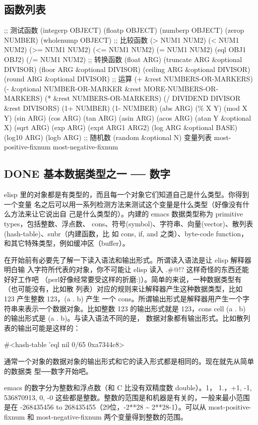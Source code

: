 \documentclass[11pt]{ctexart}
\begin{document}
\subsection{函数列表}
\label{sec:org5c351c1}
;; 测试函数
(integerp OBJECT)
(floatp OBJECT)
(numberp OBJECT)
(zerop NUMBER)
(wholenump OBJECT)
;; 比较函数
(> NUM1 NUM2)
(< NUM1 NUM2)
(>= NUM1 NUM2)
(<= NUM1 NUM2)
(= NUM1 NUM2)
(eql OBJ1 OBJ2)
(/= NUM1 NUM2)
;; 转换函数
(float ARG)
(truncate ARG \&optional DIVISOR)
(floor ARG \&optional DIVISOR)
(ceiling ARG \&optional DIVISOR)
(round ARG \&optional DIVISOR)
;; 运算
(+ \&rest NUMBERS-OR-MARKERS)
(- \&optional NUMBER-OR-MARKER \&rest MORE-NUMBERS-OR-MARKERS)
(* \&rest NUMBERS-OR-MARKERS)
(/ DIVIDEND DIVISOR \&rest DIVISORS)
(1+ NUMBER)
(1- NUMBER)
(abs ARG)
(\% X Y)
(mod X Y)
(sin ARG)
(cos ARG)
(tan ARG)
(asin ARG)
(acos ARG)
(atan Y \&optional X)
(sqrt ARG)
(exp ARG)
(expt ARG1 ARG2)
(log ARG \&optional BASE)
(log10 ARG)
(logb ARG)
;; 随机数
(random \&optional N)
变量列表
most-positive-fixnum
most-negative-fixnum
\subsection{{\bfseries\sffamily DONE} 基本数据类型之一 ── 数字}
\label{sec:orgb95fbb6}
elisp 里的对象都是有类型的，而且每一个对象它们知道自己是什么类型。你得到一个变量
名之后可以用一系列检测方法来测试这个变量是什么类型（好像没有什么方法来让它说出自
己是什么类型的）。内建的 emacs 数据类型称为 primitive types，包括整数、浮点数、
cons、符号(symbol)、字符串、向量(vector)、散列表(hash-table)、subr（内建函数，比
如 cons, if, and 之类）、byte-code function，和其它特殊类型，例如缓冲区（buffer）。

在开始前有必要先了解一下读入语法和输出形式。所谓读入语法是让 elisp 解释器明白输
入字符所代表的对象，你不可能让 elisp 读入 .\#@!? 这样奇怪的东西还能好好工作吧
（perl好像经常要受这样的折磨:)）。简单的来说，一种数据类型有（也可能没有，比如散
列表）对应的规则来让解释器产生这种数据类型，比如 123 产生整数 123，(a . b) 产生
一个 cons。所谓输出形式是解释器用产生一个字符串来表示一个数据对象。比如整数 123
的输出形式就是 123，cons cell (a . b) 的输出形式是 (a . b)。与读入语法不同的是，
数据对象都有输出形式。比如散列表的输出可能是这样的：

\#<hash-table 'eql nil 0/65 0xa7344c8>

通常一个对象的数据对象的输出形式和它的读入形式都是相同的。现在就先从简单的数据类
型──数字开始吧。

emacs 的数字分为整数和浮点数（和 C 比没有双精度数 double）。1， 1.，+1, -1,
536870913, 0, -0 这些都是整数。整数的范围是和机器是有关的，一般来最小范围是在
-268435456 to 268435455（29位，-2**28 \textasciitilde{} 2**28-1）。可以从 most-positive-fixnum
和 most-negative-fixnum 两个变量得到整数的范围。
\end{document}
